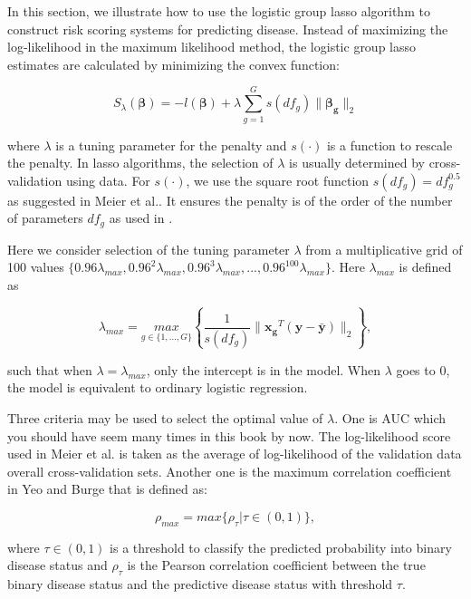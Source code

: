 \documentclass[
  12pt,
]{krantz}
\begin{document}
In this section, we illustrate how to use the logistic group lasso algorithm to construct risk scoring systems for predicting disease. Instead of maximizing the log-likelihood in the maximum likelihood method, the logistic group lasso estimates are calculated by minimizing the convex function:

\[
S_{\lambda}(\symbf{\beta})=-l(\symbf{\beta})+\lambda\sum_{g=1}^{G}s(df_{g})\parallel\symbf{\beta_{g}}\parallel_{2}
\]

where \(\lambda\) is a tuning parameter for the penalty and \(s(\cdot)\) is a function to rescale the penalty. In lasso algorithms, the selection of \(\lambda\) is usually determined by cross-validation using data. For \(s(\cdot)\), we use the square root function \(s(df_g)=df_g^{0.5}\) as suggested in Meier et al.\citep{Meier2008}. It ensures the penalty is of the order of the number of parameters \(df_g\) as used in \citep{Yuan2007}.

Here we consider selection of the tuning parameter \(\lambda\) from a multiplicative grid of 100 values \(\{0.96\lambda_{max},0.96^{2}\lambda_{max},0.96^{3}\lambda_{max},...,0.96^{100}\lambda_{max}\}\). Here \(\lambda_{max}\) is defined as

\begin{equation}
\lambda_{max}=\underset{g\in\{1,...,G\}}{max}\left\{\frac{1}{s(df_{g})}\parallel \mathbf{x_{g}}^{T}(\mathbf{y}-\bar{\mathbf{y}} )\parallel_{2}\right\},
\end{equation}

such that when \(\lambda=\lambda_{max}\), only the intercept is
in the model. When \(\lambda\) goes to \(0\), the model is equivalent to ordinary
logistic regression.

Three criteria may be used to select the optimal value of \(\lambda\). One is AUC which you should have seem many times in this book by now. The log-likelihood score used in Meier et al. \citep{Meier2008} is taken as the average of log-likelihood of the validation data overall cross-validation sets. Another one is the maximum correlation coefficient in Yeo and Burge \citep{Yeo2004} that is defined as:

\[
\rho_{max}=max\{\rho_{\tau}|\tau\in(0,1)\},
\]

where \(\tau\in(0,1)\) is a threshold to classify the predicted probability into binary disease status and \(\rho_\tau\) is the Pearson correlation coefficient between the true binary disease status and the predictive disease status with threshold \(\tau\).
\end{document}
